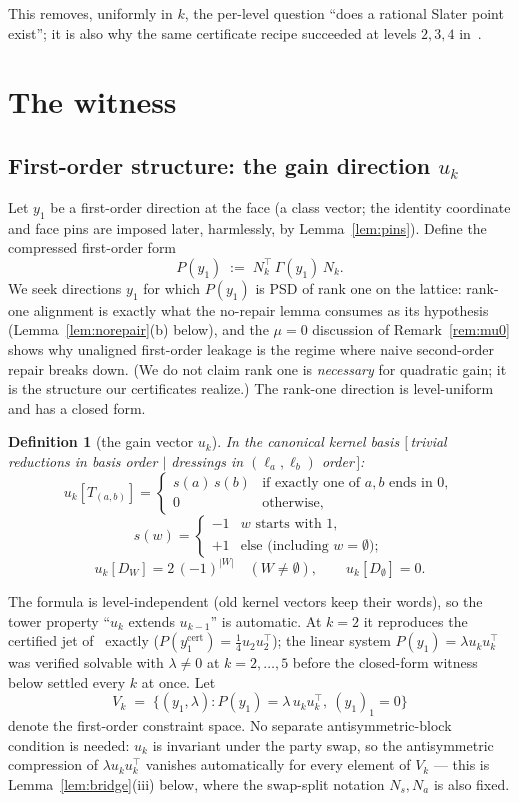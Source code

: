 \documentclass[11pt]{article}
\newtheorem{definition}[theorem]{Definition}
\newcommand{\lam}{\lambda}
\begin{document}
This removes, uniformly in $k$, the per-level question ``does a rational
Slater point exist''; it is also why the same certificate recipe succeeded
at levels $2,3,4$ in~\cite{overshoot}.

\section{The witness}\label{sec:witness}

\subsection{First-order structure: the gain direction $u_k$}
\label{sec:uk}

Let $y_1$ be a first-order direction at the face (a class vector; the
identity coordinate and face pins are imposed later, harmlessly, by
Lemma~\ref{lem:pins}). Define the compressed first-order form
\[
P(y_1)\;:=\;N_k^\top\,\Gamma(y_1)\,N_k .
\]
We seek directions $y_1$ for which $P(y_1)$ is PSD of rank one on the
lattice: rank-one alignment is exactly what the no-repair lemma consumes
as its hypothesis (Lemma~\ref{lem:norepair}(b) below), and the $\mu=0$
discussion of Remark~\ref{rem:mu0} shows why unaligned first-order
leakage is the regime where naive second-order repair breaks down. (We do
not claim rank one is \emph{necessary} for quadratic gain; it is the
structure our certificates realize.) The rank-one direction is
level-uniform and has a closed form.

\begin{definition}[the gain vector $u_k$]\label{def:uk}
In the canonical kernel basis $[\,$trivial reductions in basis order
$\mid$ dressings in $(\ell_a,\ell_b)$ order$\,]$:
\[
u_k[T_{(a,b)}]=\begin{cases}
s(a)\,s(b)&\text{if exactly one of }a,b\text{ ends in }0,\\
0&\text{otherwise},
\end{cases}
\]
\[
s(w)=\begin{cases}-1&w\text{ starts with }1,\\ +1&\text{else (including }w=\emptyset\text{)};\end{cases}
\]
\[
u_k[D_W]=2\,(-1)^{|W|}\quad(W\ne\emptyset),\qquad u_k[D_\emptyset]=0 .
\]
\end{definition}

The formula is level-independent (old kernel vectors keep their words), so
the tower property ``$u_k$ extends $u_{k-1}$'' is automatic. At $k=2$ it
reproduces the certified jet of~\cite{overshoot} exactly
($P(y_1^{\mathrm{cert}})=\tfrac14u_2u_2^\top$); the linear system
$P(y_1)=\lam u_ku_k^\top$ was verified solvable with $\lam\ne0$ at
$k=2,\dots,5$ before the closed-form witness below settled every $k$ at
once. Let
\[
V_k\;=\;\{(y_1,\lam):P(y_1)=\lam\,u_ku_k^\top,\ (y_1)_1=0\}
\]
denote the first-order constraint space. No separate antisymmetric-block
condition is needed: $u_k$ is invariant under the party swap, so the
antisymmetric compression of $\lam u_ku_k^\top$ vanishes automatically for
every element of $V_k$ --- this is Lemma~\ref{lem:bridge}(iii) below, where
the swap-split notation $N_s,N_a$ is also fixed.
\end{document}
